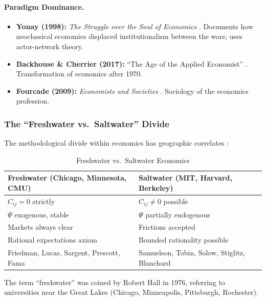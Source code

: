 \paragraph{Paradigm Dominance.}
\begin{itemize}[nosep]
    \item \textbf{Yonay (1998):} \textit{The Struggle over the Soul of Economics}
        \citep{yonay1998struggle}. Documents how neoclassical economics displaced institutionalism
        between the wars; uses actor-network theory.
    \item \textbf{Backhouse \& Cherrier (2017):} ``The Age of the Applied Economist''
        \citep{backhouse2017age}. Transformation of economics after 1970.
    \item \textbf{Fourcade (2009):} \textit{Economists and Societies} \citep{fourcade2009economists}.
        Sociology of the economics profession.
\end{itemize}

\subsubsection{The ``Freshwater vs.\ Saltwater'' Divide}

The methodological divide within economics has geographic correlates
\citep{hall1976notes}:

\begin{table}[htbp]
\centering
\caption{Freshwater vs.\ Saltwater Economics}
\label{tab:freshwater-saltwater}
\renewcommand{\arraystretch}{1.3}
\small
\begin{tabular}{@{}p{5.5cm}p{5.5cm}@{}}
\toprule
\textbf{Freshwater (Chicago, Minnesota, CMU)} & \textbf{Saltwater (MIT, Harvard, Berkeley)} \\
\midrule
$C_{ij} = 0$ strictly & $C_{ij} \neq 0$ possible \\
$\Psi$ exogenous, stable & $\Psi$ partially endogenous \\
Markets always clear & Frictions accepted \\
Rational expectations axiom & Bounded rationality possible \\
\midrule
Friedman, Lucas, Sargent, Prescott, Fama & Samuelson, Tobin, Solow, Stiglitz, Blanchard \\
\bottomrule
\end{tabular}
\end{table}

The term ``freshwater'' was coined by Robert Hall in 1976, referring to universities
near the Great Lakes (Chicago, Minneapolis, Pittsburgh, Rochester).

